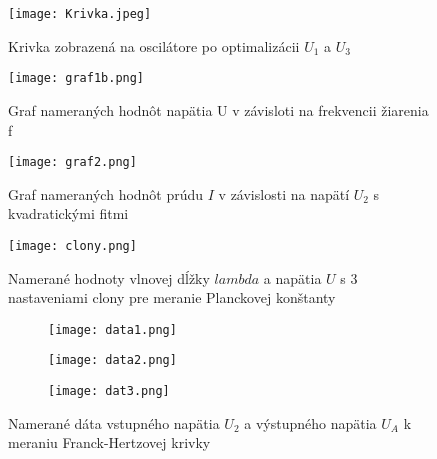 \documentclass{article}
\begin{document}
\begin{figure}
\centering
\texttt{[image: Krivka.jpeg]}
\caption{\label{fig:oscilator}Krivka zobrazená na oscilátore po optimalizácii $U_1$ a $U_3$}
\end{figure}

\begin{figure}
\centering
\texttt{[image: graf1b.png]}
\caption{\label{fig:graf1}Graf nameraných hodnôt napätia U v závisloti na frekvencii žiarenia f }
\end{figure}

\begin{figure}
\centering
\texttt{[image: graf2.png]}
\caption{\label{fig:graf2} Graf nameraných hodnôt prúdu $I$ v závislosti na napätí $U_2$ s kvadratickými fitmi}
\end{figure}

\begin{figure}
\centering
\texttt{[image: clony.png]}
\caption{\label{fig:clony} Namerané hodnoty vlnovej dĺžky  
 $lambda$ a napätia $U$ s 3 nastaveniami clony pre meranie Planckovej konštanty }
\end{figure}


\begin{figure}[h] 
  \centering
  \begin{subfigure}[b]{0.3\linewidth} 
    \texttt{[image: data1.png]}
    \label{fig:data1}
  \end{subfigure}
  \hspace{0.02\linewidth} 
  \begin{subfigure}[b]{0.3\linewidth} 
    \texttt{[image: data2.png]}
    \label{fig:data2}
  \end{subfigure}
  \hspace{0.02\linewidth} 
  \begin{subfigure}[b]{0.3\linewidth} 
    \texttt{[image: dat3.png]}
    \label{fig:data3}
  \end{subfigure}
  \caption{Namerané dáta vstupného napätia $U_2$ a výstupného napätia $U_A$ k meraniu Franck-Hertzovej krivky}
  \label{fig:trojica_obrazkov}
\end{figure} 
\end{document}
